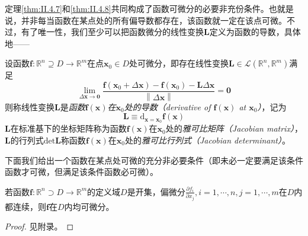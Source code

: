 \documentclass[main.tex]{subfiles}
\begin{document}
定理\ref{thm:II.4.7}和\ref{thm:II.4.8}共同构成了函数可微分的必要非充份条件。也就是说，并非每当函数在某点处的所有偏导数都存在，该函数就一定在该点可微\cite[“例2”,p.~21]{华工高数2009下}。不过，有了唯一性，我们至少可以把函数微分的线性变换$\mathbf{L}$定义为函数的导数，具体地——

\begin{definition}[向量函数的导数]\label{def:II.4.14}
    设函数$\mathbf{f}:\mathbb{R}^n\supseteq D\rightarrow\mathbb{R}^m$在点$\mathbf{x}_0\in D$处可微分，即存在线性变换$\mathbf{L}\in\mathcal{L}\left(\mathbb{R}^n,\mathbb{R}^m\right)$满足
    \[
        \lim_{\Delta\mathbf{x}\to\mathbf{0}}\frac{\mathbf{f}\left(\mathbf{x}_0+\Delta \mathbf{x}\right)-\mathbf{f}\left(\mathbf{x}_0\right)-\mathbf{L}\Delta\mathbf{x}}{\left\|\Delta\mathbf{x}\right\|}=\mathbf{0}
    \]
    则称线性变换$\mathbf{L}$是\emph{函数$\mathbf{f}\left(\mathbf{x}\right)$在$\mathbf{x}_0$处的导数（derivative of $\mathbf{f}\left(\mathbf{x}\right)$ at $\mathbf{x}_0$）}，记为
    \[\mathbf{L}\equiv \mathrm{d}_{\mathbf{x}=\mathbf{x}_0}\mathbf{f}\left(\mathbf{x}\right)\]
    $\mathbf{L}$在标准基下的坐标矩阵称为函数$\mathbf{f}\left(\mathbf{x}\right)$在$\mathbf{x}_0$处的\emph{雅可比矩阵（Jacobian matrix）}，$\mathbf{L}$的行列式$\mathrm{det}\mathbf{L}$称函数$\mathbf{f}\left(\mathbf{x}\right)$在$\mathbf{x}_0$处的\emph{雅可比行列式（Jacobian determinant）}。
\end{definition}

下面我们给出一个函数在某点处可微的充分非必要条件（即未必一定要满足该条件函数才可微，但满足该条件函数必可微）\cite[“例3”,p.~23]{华工高数2009下}。

\begin{theorem}\label{thm:II.4.9}
    若函数$\mathbf{f}:\mathbb{R}^n\supset D\rightarrow\mathbb{R}^m$的定义域$D$是开集，偏微分$\frac{\partial f_i}{\partial x_j},i=1,\cdots,n,j=1,\cdots,m$在$D$内都连续，则$\mathbf{f}$在$D$内均可微分。
\end{theorem}
\begin{proof}
    见附录。
\end{proof}
\end{document}
